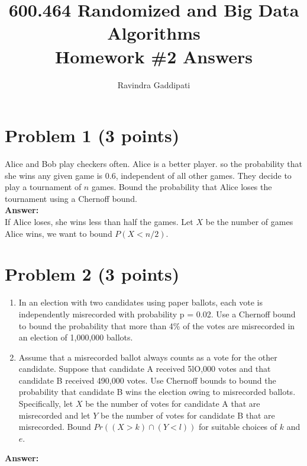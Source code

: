 \documentclass[letterpaper, 11pt]{article}
\begin{document}
\renewcommand{\theenumi}{\alph{enumi}}



\title{600.464 Randomized and Big Data Algorithms \\ Homework \#2 Answers}
\author{Ravindra Gaddipati}


\maketitle

\pagebreak
\section*{Problem 1 (3 points)}
Alice and Bob play checkers often. Alice is a better player. so the probability that she wins any given game is 0.6, independent of all other games. They decide to play a tournament of $n$ games. Bound the probability that Alice loses the tournament using a Chernoff bound. \\
\textbf{Answer:} \\
If Alice loses, she wins less than half the games. Let $X$ be the number of games Alice wins, we want to bound $P(X < n/2)$.

\pagebreak
\section*{Problem 2 (3 points)}
\begin{enumerate}
	\item In an election with two candidates using paper ballots, each vote is independently misrecorded with probability p = 0.02. Use a Chernoff bound to bound the probability that more than 4\% of the votes are misrecorded in an election of 1,000,000 ballots.
	\item Assume that a misrecorded ballot always counts as a vote for the other candidate. Suppose that candidate A received 5lO,000 votes and that candidate B received 490,000 votes. Use Chernoff bounds to bound the probability that candidate B wins the election owing to misrecorded ballots. Specifically, let $X$ be the number of votes for candidate A that are misrecorded and let $Y$ be the number of votes for candidate B that are misrecorded. Bound $Pr((X > k) \cap (Y < l))$ for suitable choices of $k$ and $e$. 
\end{enumerate}
\textbf{Answer:} \\
\end{document}
